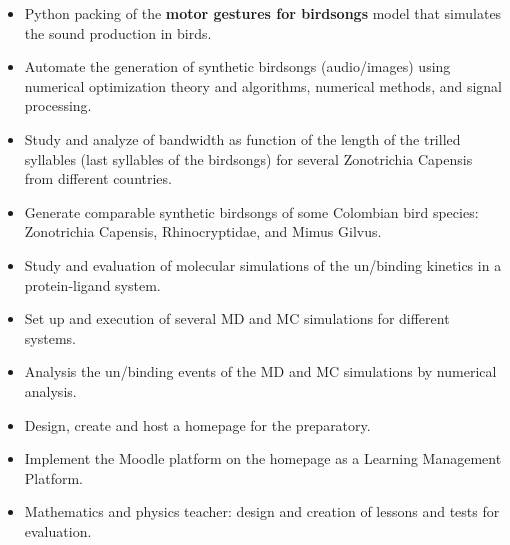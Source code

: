 \documentclass[10pt,letter,ragged2e,withhyper]{altacv}
\begin{document}
\begin{paracol}{2}
\begin{itemize}
\item Python packing of the \textbf{motor gestures for birdsongs} model that simulates the sound production in birds.
\item Automate the generation of synthetic birdsongs (audio/images) using numerical optimization theory and algorithms, numerical methods, and signal processing.
\item Study and analyze of bandwidth as function of the length of the trilled syllables (last syllables of the birdsongs) for several Zonotrichia Capensis from different countries.
\item Generate comparable synthetic birdsongs of some Colombian bird species: Zonotrichia Capensis, Rhinocryptidae, and Mimus Gilvus.

\end{itemize}

\divider

\begin{itemize}
\item Study and evaluation of molecular simulations of the un/binding kinetics in a protein-ligand system.
\item Set up and execution of several MD and MC simulations for different systems.
\item Analysis the un/binding events of the MD and MC simulations by numerical analysis.
\end{itemize}

\divider

\begin{itemize}
\item Design, create and host a homepage for the preparatory.
\item Implement the Moodle platform on the homepage as a Learning Management Platform.
\item Mathematics and physics teacher: design and creation of lessons and tests for evaluation.
\end{itemize}


\end{paracol}
\end{document}
